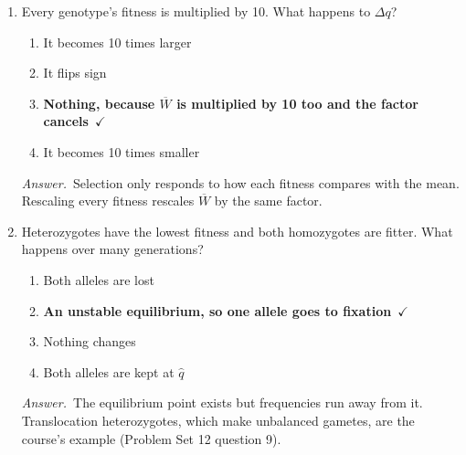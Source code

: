 \documentclass[11pt]{article}
\newcommand{\keyans}[1]{\par\medskip\noindent\textit{Answer.}\ #1\par\medskip}
\begin{document}
\begin{enumerate}[label=\textbf{\arabic*.}, leftmargin=2em, itemsep=1.4em]
\item Every genotype's fitness is multiplied by 10. What happens to \(\Delta q\)?
\nopagebreak\par{}
\par\smallskip
\begin{enumerate}[label={}, leftmargin=2.4em, labelwidth=0pt, itemsep=2pt, topsep=0pt]
\item \hspace*{-2.4em}It becomes 10 times larger
\item \hspace*{-2.4em}It flips sign
\item \hspace*{-2.4em}\textbf{Nothing, because \(\overline{W}\) is multiplied by 10 too and the factor cancels}\ \(\checkmark\)
\item \hspace*{-2.4em}It becomes 10 times smaller
\end{enumerate}
\keyans{Selection only responds to how each fitness compares with the mean. Rescaling every fitness rescales \(\overline{W}\) by the same factor.}
\item Heterozygotes have the lowest fitness and both homozygotes are fitter. What happens over many generations?
\nopagebreak\par{}
\par\smallskip
\begin{enumerate}[label={}, leftmargin=2.4em, labelwidth=0pt, itemsep=2pt, topsep=0pt]
\item \hspace*{-2.4em}Both alleles are lost
\item \hspace*{-2.4em}\textbf{An unstable equilibrium, so one allele goes to fixation}\ \(\checkmark\)
\item \hspace*{-2.4em}Nothing changes
\item \hspace*{-2.4em}Both alleles are kept at \(\hat{q}\)
\end{enumerate}
\keyans{The equilibrium point exists but frequencies run away from it. Translocation heterozygotes, which make unbalanced gametes, are the course's example (Problem Set 12 question 9).}
\end{enumerate}
\end{document}
